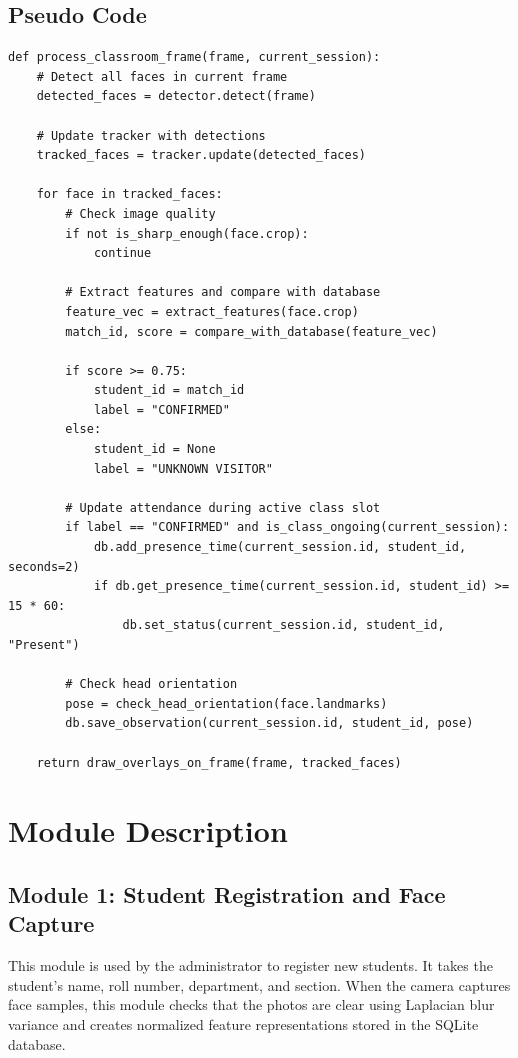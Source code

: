 \documentclass[10pt]{report}
\begin{document}
\subsection{Pseudo Code}
\begin{lstlisting}[caption={Classroom Frame Processing and Attendance Pseudo Code}]
def process_classroom_frame(frame, current_session):
    # Detect all faces in current frame
    detected_faces = detector.detect(frame)
    
    # Update tracker with detections
    tracked_faces = tracker.update(detected_faces)
    
    for face in tracked_faces:
        # Check image quality
        if not is_sharp_enough(face.crop):
            continue
            
        # Extract features and compare with database
        feature_vec = extract_features(face.crop)
        match_id, score = compare_with_database(feature_vec)
        
        if score >= 0.75:
            student_id = match_id
            label = "CONFIRMED"
        else:
            student_id = None
            label = "UNKNOWN VISITOR"
            
        # Update attendance during active class slot
        if label == "CONFIRMED" and is_class_ongoing(current_session):
            db.add_presence_time(current_session.id, student_id, seconds=2)
            if db.get_presence_time(current_session.id, student_id) >= 15 * 60:
                db.set_status(current_session.id, student_id, "Present")
                
        # Check head orientation
        pose = check_head_orientation(face.landmarks)
        db.save_observation(current_session.id, student_id, pose)
        
    return draw_overlays_on_frame(frame, tracked_faces)
\end{lstlisting}

\section{Module Description}

\subsection{Module 1: Student Registration and Face Capture}
\hspace{0.5cm}This module is used by the administrator to register new students. It takes the student's name, roll number, department, and section. When the camera captures face samples, this module checks that the photos are clear using Laplacian blur variance and creates normalized feature representations stored in the SQLite database.
\end{document}
